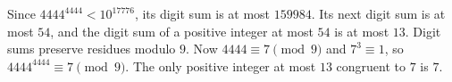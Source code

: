 Since $4444^{4444}<10^{17776}$, its digit sum is at most $159984$. Its next digit sum is at most $54$, and the digit sum of a positive integer at most $54$ is at most $13$. Digit sums preserve residues modulo $9$. Now $4444\equiv7\pmod9$ and $7^3\equiv1$, so $4444^{4444}\equiv7\pmod9$. The only positive integer at most $13$ congruent to $7$ is $\boxed7$.
